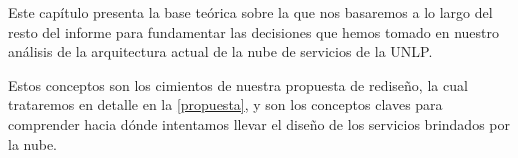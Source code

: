 Este capítulo presenta la base teórica sobre la que nos basaremos a lo largo del resto del informe para fundamentar las decisiones que hemos tomado en nuestro análisis de la arquitectura actual de la nube de servicios de la UNLP.

Estos conceptos son los cimientos de nuestra propuesta de rediseño, la cual trataremos en detalle en la \autoref{propuesta}, y son los conceptos claves para comprender hacia dónde intentamos llevar el diseño de los servicios brindados por la nube.
